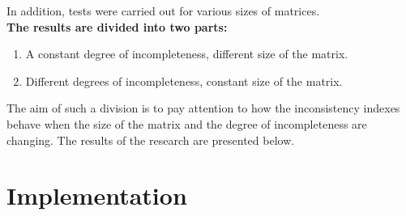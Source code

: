 In addition, tests were carried out for various sizes of matrices.\\
\textbf{The results are divided into two parts:}
\begin{enumerate}
  \item A constant degree of incompleteness, different size of the matrix.
  \item Different degrees of incompleteness, constant size of the matrix.
\end{enumerate}

The aim of such a division is to pay attention to how the inconsistency indexes behave when the size of the matrix and the degree of incompleteness are changing. The results of the research are presented below.


\section{Implementation}
